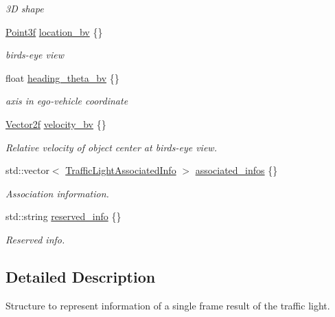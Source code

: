 \begin{DoxyCompactItemize}
\begin{DoxyCompactList}\small\item\em 3D shape \end{DoxyCompactList}\item 
\hyperlink{structmaf__perception__interface_1_1Point3f}{Point3f} \hyperlink{structmaf__perception__interface_1_1TrafficLightSingleFrame_ad3d145e0c32b96a4a686f13f78023bd6}{location\+\_\+bv} \{\}
\begin{DoxyCompactList}\small\item\em bird\textquotesingle{}s-\/eye view \end{DoxyCompactList}\item 
float \hyperlink{structmaf__perception__interface_1_1TrafficLightSingleFrame_a1278e917d22a08f669325c4df51ec2e7}{heading\+\_\+theta\+\_\+bv} \{\}
\begin{DoxyCompactList}\small\item\em axis in ego-\/vehicle coordinate \end{DoxyCompactList}\item 
\hyperlink{structmaf__perception__interface_1_1Vector2f}{Vector2f} \hyperlink{structmaf__perception__interface_1_1TrafficLightSingleFrame_aa265a40e79dcb11592772cd516452510}{velocity\+\_\+bv} \{\}
\begin{DoxyCompactList}\small\item\em Relative velocity of object center at bird\textquotesingle{}s-\/eye view. \end{DoxyCompactList}\item 
std\+::vector$<$ \hyperlink{structmaf__perception__interface_1_1TrafficLightAssociatedInfo}{Traffic\+Light\+Associated\+Info} $>$ \hyperlink{structmaf__perception__interface_1_1TrafficLightSingleFrame_a36b5faf50e8da3a627dc6634866e338e}{associated\+\_\+infos} \{\}
\begin{DoxyCompactList}\small\item\em Association information. \end{DoxyCompactList}\item 
std\+::string \hyperlink{structmaf__perception__interface_1_1TrafficLightSingleFrame_a7c789cfb41bc765d66b1716a217f09e7}{reserved\+\_\+info} \{\}
\begin{DoxyCompactList}\small\item\em Reserved info. \end{DoxyCompactList}\end{DoxyCompactItemize}


\subsection{Detailed Description}
Structure to represent information of a single frame result of the traffic light. 

